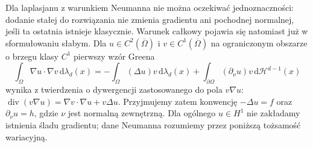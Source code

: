 Dla laplasjanu z warunkiem Neumanna nie można oczekiwać
jednoznaczności: dodanie stałej do rozwiązania nie zmienia
gradientu ani pochodnej normalnej, jeśli ta ostatnia
istnieje klasycznie. Warunek całkowy pojawia się
natomiast już w sformułowaniu słabym.
Dla $u\in C^2(\overline\Omega)$ i
$v\in C^1(\overline\Omega)$ na ograniczonym obszarze
o brzegu klasy $C^1$ pierwszy wzór Greena
\[
 \int_\Omega\nabla u\cdot\nabla v\,\mathrm d\lambda_d(x)
 =-\int_\Omega(\Delta u)v\,\mathrm d\lambda_d(x)
   +\int_{\partial\Omega}(\partial_\nu u)v\,
                                      \mathrm d\mathcal H^{d-1}(x)
\]
wynika z twierdzenia o dywergencji zastosowanego
do pola $v\nabla u$: $\operatorname{div}(v\nabla u)
=\nabla v\cdot\nabla u+v\Delta u$.
Przyjmujemy zatem konwencję $-\Delta u=f$ oraz
$\partial_\nu u=h$, gdzie $\nu$ jest normalną zewnętrzną.
Dla ogólnego $u\in H^1$ nie zakładamy istnienia śladu
gradientu; dane Neumanna rozumiemy przez poniższą
tożsamość wariacyjną.


